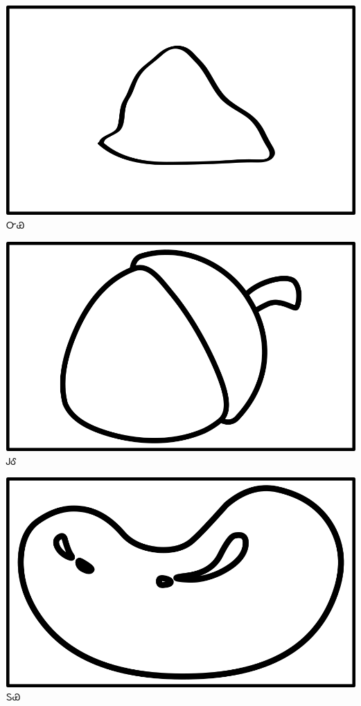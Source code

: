 \documentclass[avery5371]{flashcards}%
\begin{document}
    \begin{flashcard}{
        \includegraphics[width=0.95\columnwidth,height=.51\columnwidth,keepaspectratio]{../artwork/objects-neutral/nvya}
    }
        \Huge ᏅᏯ
    \end{flashcard}

    \begin{flashcard}{
        \includegraphics[width=0.95\columnwidth,height=.51\columnwidth,keepaspectratio]{../artwork/objects-neutral/gule}
    }
        \Huge ᎫᎴ
    \end{flashcard}

    \begin{flashcard}{
        \includegraphics[width=0.95\columnwidth,height=.51\columnwidth,keepaspectratio]{../artwork/objects-neutral/tuya}
    }
        \Huge ᏚᏯ
    \end{flashcard}
\end{document}
